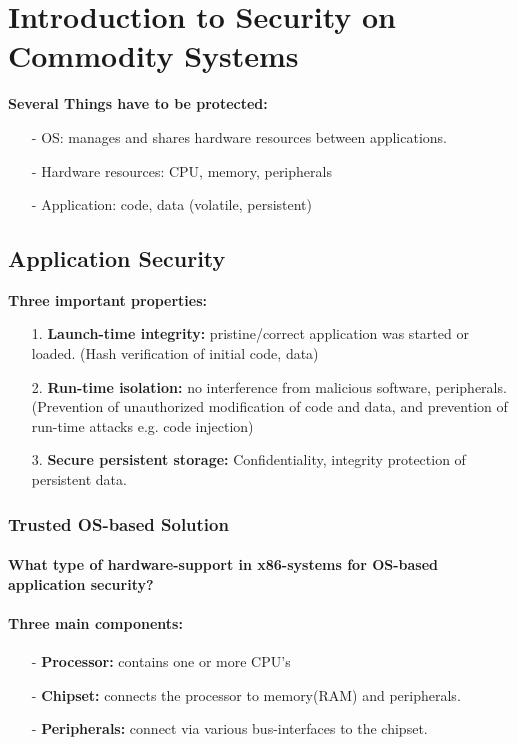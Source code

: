 \section{Introduction to Security on Commodity Systems}

\textbf{Several Things have to be protected:}
\begin{itemize}
    \item[-]OS: manages and shares hardware resources between applications.
    \item[-]Hardware resources: CPU, memory, peripherals
    \item[-]Application: code, data (volatile, persistent)
\end{itemize}{}

\subsection{Application Security}
\textbf{Three important properties: }
\begin{itemize}
    \item[1.]\textbf{Launch-time integrity: }pristine/correct application was started or loaded. (Hash verification of initial code, data)
    \item[2.]\textbf{Run-time isolation: }no interference from malicious software, peripherals. (Prevention of unauthorized modification of code and data, and prevention of run-time attacks e.g. code injection)
    \item[3.]\textbf{Secure persistent storage: } Confidentiality, integrity protection of persistent data.
\end{itemize}{}

\subsubsection{Trusted OS-based Solution} 

\paragraph{What type of hardware-support in x86-systems for OS-based application security?}

\paragraph{Three main components: }
\begin{itemize}
    \item[-]\textbf{Processor: }contains one or more CPU's
    \item[-]\textbf{Chipset: }connects the processor to memory(RAM) and peripherals.
    \item[-]\textbf{Peripherals: }connect via various bus-interfaces to the chipset.
\end{itemize}{}

